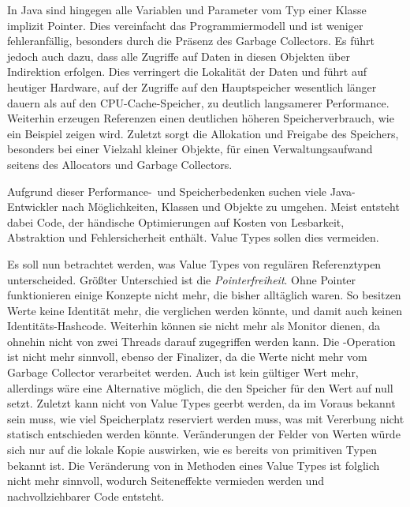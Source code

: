 In Java sind hingegen alle Variablen und Parameter vom Typ einer Klasse implizit Pointer.
Dies vereinfacht das Programmiermodell und ist weniger fehleranfällig, besonders durch die Präsenz des Garbage Collectors.
Es führt jedoch auch dazu, dass alle Zugriffe auf Daten in diesen Objekten über Indirektion erfolgen.
Dies verringert die Lokalität der Daten und führt auf heutiger Hardware, auf der Zugriffe auf den Hauptspeicher wesentlich länger dauern als auf den CPU-Cache-Speicher, zu deutlich langsamerer Performance. %
Weiterhin erzeugen Referenzen einen deutlichen höheren Speicherverbrauch, wie ein Beispiel zeigen wird. %
Zuletzt sorgt die Allokation und Freigabe des Speichers, besonders bei einer Vielzahl kleiner Objekte, für einen Verwaltungsaufwand seitens des Allocators und Garbage Collectors.

Aufgrund dieser Performance-\ und Speicherbedenken suchen viele Java-Entwickler nach Möglichkeiten, Klassen und Objekte zu umgehen.
Meist entsteht dabei Code, der händische Optimierungen auf Kosten von Lesbarkeit, Abstraktion und Fehlersicherheit enthält.
Value Types sollen dies vermeiden.

Es soll nun betrachtet werden, was Value Types von regulären Referenztypen unterscheided.
Größter Unterschied ist die \emph{Pointerfreiheit}.
Ohne Pointer funktionieren einige Konzepte nicht mehr, die bisher alltäglich waren.
So besitzen Werte keine Identität mehr, die verglichen werden könnte, und damit auch keinen Identitäts-Hashcode.
Weiterhin können sie nicht mehr als Monitor dienen, da ohnehin nicht von zwei Threads darauf zugegriffen werden kann.
Die -Operation ist nicht mehr sinnvoll, ebenso der Finalizer, da die Werte nicht mehr vom Garbage Collector verarbeitet werden.
Auch  ist kein gültiger Wert mehr, allerdings wäre eine Alternative möglich, die den Speicher für den Wert auf null setzt.
Zuletzt kann nicht von Value Types geerbt werden, da im Voraus bekannt sein muss, wie viel Speicherplatz reserviert werden muss, was mit Vererbung nicht statisch entschieden werden könnte.
Veränderungen der Felder von Werten würde sich nur auf die lokale Kopie auswirken, wie es bereits von primitiven Typen bekannt ist.
Die Veränderung von  in Methoden eines Value Types ist folglich nicht mehr sinnvoll, wodurch Seiteneffekte vermieden werden und nachvollziehbarer Code entsteht.

